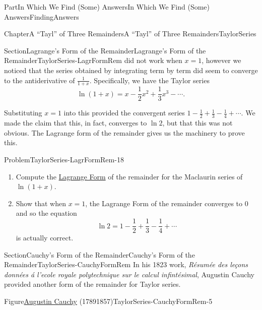 \documentclass[oneside,10pt,]{book}
\numberwithin{equation}{part}
\begin{document}
\begin{partptx}{Part}{In Which We Find (Some) Answers}{}{In Which We Find (Some) Answers}{}{}{FindingAnswers}
\begin{chapterptx}{Chapter}{A ``Tayl'' of Three Remainders}{}{A ``Tayl'' of Three Remainders}{}{}{TaylorSeries}
\begin{sectionptx}{Section}{Lagrange's Form of the Remainder}{}{Lagrange's Form of the Remainder}{}{}{TaylorSeries-LagrFormRem}
did not work when \(x=1\), however we noticed that the series obtained by integrating term by term did seem to converge to the antiderivative of \(\frac{1}{1+x}\). Specifically, we have the Taylor series%
\begin{equation*}
\ln\left(1+x\right)=x-\frac{1}{2}x^2+\frac{1}{3}x^3-\cdots\text{.}
\end{equation*}
%
\par
Substituting \(x=1\) into this provided the convergent series \(1-\frac{1}{2}+\frac{1}{3}-\frac{1}{4}+\cdots\). We made the claim that this, in fact, converges to \(\ln 2\), but that this was not obvious. The Lagrange form of the remainder gives us the machinery to prove this.%
\begin{problem}{Problem}{}{TaylorSeries-LagrFormRem-18}%
\begin{enumerate}[font=\bfseries,label=(\alph*),ref=\alph*]%
\item{}Compute the \hyperref[thm_LagrangeRemainder]{Lagrange Form} of the remainder for the Maclaurin series of \(\ln\left(1+x\right)\).%
\item{}Show that when \(x=1\), the Lagrange Form of the remainder converges to \(0\) and so the equation%
\begin{equation*}
\ln 2=1-\frac{1}{2}+\frac{1}{3}-\frac{1}{4}+\cdots
\end{equation*}
is actually correct.%
\end{enumerate}%
\end{problem}
\end{sectionptx}
%
%
\typeout{************************************************}
\typeout{************************************************}
%
\begin{sectionptx}{Section}{Cauchy's Form of the Remainder}{}{Cauchy's Form of the Remainder}{}{}{TaylorSeries-CauchyFormRem}
%
%
In his 1823 work, \textit{Résumée des leçons données á l’ecole royale polytechnique sur le calcul infintésimal}, Augustin Cauchy provided another form of the remainder for Taylor series.%
\begin{figureptx}{Figure}{\href{https://mathshistory.st-andrews.ac.uk/Biographies/Cauchy/}{Augustin Cauchy} (1789\textendash{}1857)}{TaylorSeries-CauchyFormRem-5}{}%
%
%
\begin{image}{0.325}{0.35}{0.325}{}%

\end{image}
\end{figureptx}
\end{sectionptx}
\end{chapterptx}
\end{partptx}
\end{document}
